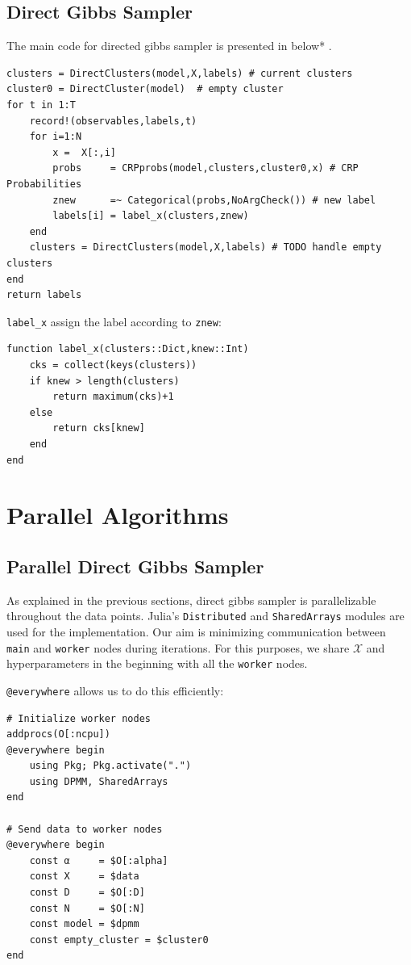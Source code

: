 \documentclass[a4paper]{article}
\begin{document}
\subsection{Direct Gibbs Sampler}

The main code for directed gibbs sampler is presented in below* .
\begin{lstlisting}
clusters = DirectClusters(model,X,labels) # current clusters
cluster0 = DirectCluster(model)  # empty cluster
for t in 1:T
    record!(observables,labels,t)
    for i=1:N
        x =  X[:,i]
        probs     = CRPprobs(model,clusters,cluster0,x) # CRP Probabilities
        znew      =~ Categorical(probs,NoArgCheck()) # new label
        labels[i] = label_x(clusters,znew)
    end
    clusters = DirectClusters(model,X,labels) # TODO handle empty clusters
end
return labels
\end{lstlisting}

\texttt{label\_x} assign the label according to \texttt{znew}:
\begin{lstlisting}[linewidth=11cm]
function label_x(clusters::Dict,knew::Int)
    cks = collect(keys(clusters))
    if knew > length(clusters)
        return maximum(cks)+1
    else
        return cks[knew]
    end
end
\end{lstlisting}


\section{Parallel Algorithms}


\subsection{Parallel Direct Gibbs Sampler}

As explained in the previous sections, direct gibbs sampler is
parallelizable throughout the data points. Julia's \texttt{Distributed}
and \texttt{SharedArrays} modules are used for the implementation. Our
aim is minimizing communication between \texttt{main} and
\texttt{worker} nodes during iterations. For this purposes, we share
\(\mathcal{X}\) and hyperparameters in the beginning with all the
\texttt{worker} nodes.

\texttt{@everywhere} allows us to do this efficiently:
\begin{lstlisting}
# Initialize worker nodes
addprocs(O[:ncpu])
@everywhere begin
    using Pkg; Pkg.activate(".")
    using DPMM, SharedArrays
end

# Send data to worker nodes
@everywhere begin
    const α     = $O[:alpha]
    const X     = $data
    const D     = $O[:D]
    const N     = $O[:N]
    const model = $dpmm
    const empty_cluster = $cluster0
end
\end{lstlisting}
\end{document}
